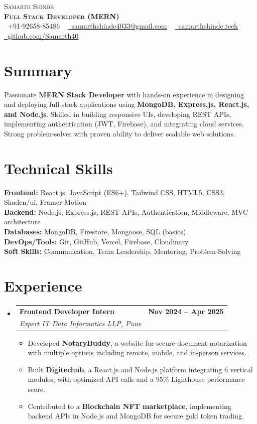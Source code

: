 \documentclass[letterpaper,11pt]{article}
\makeatletter
\newcommand{\resumeItem}[1]{\item\small{{#1 \vspace{-2pt}}}}
\newcommand{\resumeSubheading}[4]{
  \vspace{-2pt}\item
    \begin{tabular*}{1.0\textwidth}[t]{l@{\extracolsep{\fill}}r}
      \textbf{#1} & \textbf{\small #2} \\
      \textit{\small#3} & \textit{\small #4} \\
    \end{tabular*}\vspace{-6pt}
}
\newcommand{\resumeItemListStart}{\begin{itemize}}
\newcommand{\resumeItemListEnd}{\end{itemize}\vspace{-5pt}}
\newcommand{\resumeSubHeadingListStart}{\begin{itemize}[leftmargin=0.0in, label={}]}
\newcommand{\resumeSubHeadingListEnd}{\end{itemize}}
\makeatother
\begin{document}
\begin{center}
    {\Huge \scshape Samarth Shinde} \\ \vspace{4pt}
    \textbf{\Large \scshape Full Stack Developer (MERN)} \\ \vspace{4pt}
    \small \faPhone\ +91-92658-85486 ~ 
    \href{mailto:samarthshinde4033@gmail.com}{\faEnvelope\ \underline{samarthshinde4033@gmail.com}} ~ 
    \href{https://samarthshinde.tech}{\faGlobe\ \underline{samarthshinde.tech}} ~
    \href{https://github.com/Samarth40}{\faGithub\ \underline{github.com/Samarth40}}
\end{center}

\section{Summary}
Passionate \textbf{MERN Stack Developer} with hands-on experience in designing and deploying full-stack applications using \textbf{MongoDB, Express.js, React.js, and Node.js}. Skilled in building responsive UIs, developing REST APIs, implementing authentication (JWT, Firebase), and integrating cloud services. Strong problem-solver with proven ability to deliver scalable web solutions.

\section{Technical Skills}
\textbf{Frontend:} React.js, JavaScript (ES6+), Tailwind CSS, HTML5, CSS3, Shadcn/ui, Framer Motion \\
\textbf{Backend:} Node.js, Express.js, REST APIs, Authentication, Middleware, MVC architecture \\
\textbf{Databases:} MongoDB, Firestore, Mongoose, SQL (basics) \\
\textbf{DevOps/Tools:} Git, GitHub, Vercel, Firebase, Cloudinary \\
\textbf{Soft Skills:} Communication, Team Leadership, Mentoring, Problem-Solving
\section{Experience}
\resumeSubHeadingListStart
  \resumeSubheading
    {Frontend Developer Intern}{Nov 2024 -- Apr 2025}
    {Expert IT Data Informatics LLP, Pune}{}
    \resumeItemListStart
      \resumeItem{Developed \textbf{NotaryBuddy}, a website for secure document notarization with multiple options including remote, mobile, and in-person services.}
      \resumeItem{Built \textbf{Digitechub}, a React.js and Node.js platform integrating 6 vertical modules, with optimized API calls and a 95\% Lighthouse performance score.}
      \resumeItem{Contributed to a \textbf{Blockchain NFT marketplace}, implementing backend APIs in Node.js and MongoDB for secure gold token trading.}
    \resumeItemListEnd
\resumeSubHeadingListEnd
\end{document}
